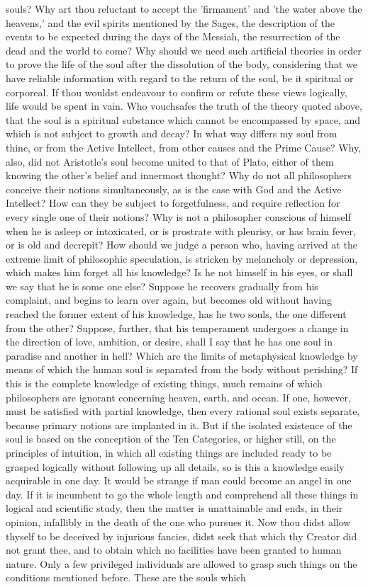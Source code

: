 \documentclass[12pt]{article}
\begin{document}
souls? Why art thou reluctant to accept the 'firmament' and 'the water above the heavens,' and the evil spirits mentioned by the Sages, the description of the events to be expected during the days of the Messiah, the resurrection of the dead and the world to come? Why should we need such artificial theories in order to prove the life of the soul after the dissolution of the body, considering that we have reliable information with regard to the return of the soul, be it spiritual or corporeal. If thou wouldst endeavour to confirm or refute these views logically, life would be spent in vain. Who vouchsafes the truth of the theory quoted above, that the soul is a spiritual substance which cannot be encompassed by space, and which is not subject to growth and decay? In what way differs my soul from thine, or from the Active Intellect, from other causes and the Prime Cause? Why, also, did not Aristotle's soul become united to that of Plato, either of them knowing the other's belief and innermost thought? Why do not all philosophers conceive their notions simultaneously, as is the case with God and the Active Intellect? How can they be subject to forgetfulness, and require reflection for every single one of their notions? Why is not a philosopher conscious of himself when he is asleep or intoxicated, or is prostrate with pleurisy, or has brain fever, or is old and decrepit? How should we judge a person who, having arrived at the extreme limit of philosophic speculation, is stricken by melancholy or depression, which makes him forget all his knowledge? Is he not himself in his eyes, or shall we say that he is some one else? Suppose he recovers gradually from his complaint, and begins to learn over again, but becomes old without having reached the former extent of his knowledge, has he two souls, the one different from the other? Suppose, further, that his temperament undergoes a change in the direction of love, ambition, or desire, shall I say that he has one soul in paradise and another in hell? Which are the limits of metaphysical knowledge by means of which the human soul is separated from the body without perishing? If this is the complete knowledge of existing things, much remains of which philosophers are ignorant concerning heaven, earth, and ocean. If one, however, must be satisfied with partial knowledge, then every rational soul exists separate, because primary notions are implanted in it. But if the isolated existence of the soul is based on the conception of the Ten Categories, or higher still, on the principles of intuition, in which all existing things are included ready to be grasped logically without following up all details, so is this a knowledge easily acquirable in one day. It would be strange if man could become an angel in one day. If it is incumbent to go the whole length and comprehend all these things in logical and scientific study, then the matter is unattainable and ends, in their opinion, infallibly in the death of the one who pursues it. Now thou didst allow thyself to be deceived by injurious fancies, didst seek that which thy Creator did not grant thee, and to obtain which no facilities have been granted to human nature. Only a few privileged individuals are allowed to grasp such things on the conditions mentioned before. These are the souls which 
\end{document}
